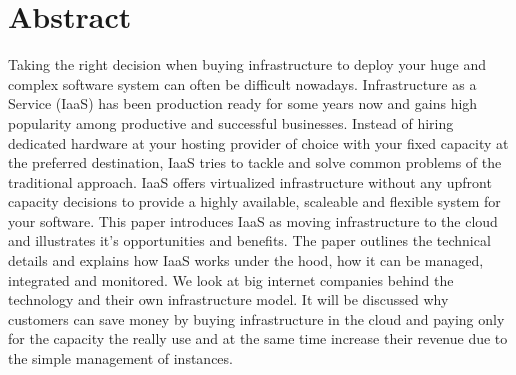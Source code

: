\chapter*{Abstract}

Taking the right decision when buying infrastructure to deploy your huge and complex software system can often be difficult nowadays. Infrastructure as a Service (IaaS) has been production ready for some years now and gains high popularity among productive and successful businesses. Instead of hiring dedicated hardware at your hosting provider of choice with your fixed capacity at the preferred destination, IaaS tries to tackle and solve common problems of the traditional approach. IaaS offers virtualized infrastructure without any upfront capacity decisions to provide a highly available, scaleable and flexible system for your software. This paper introduces IaaS as moving infrastructure to the cloud and illustrates it's opportunities and benefits. The paper outlines the technical details and explains how IaaS works under the hood, how it can be managed, integrated and monitored. We look at big internet companies behind the technology and their own infrastructure model. It will be discussed why customers can save money by buying infrastructure in the cloud and paying only for the capacity the really use and at the same time increase their revenue due to the simple management of instances. 